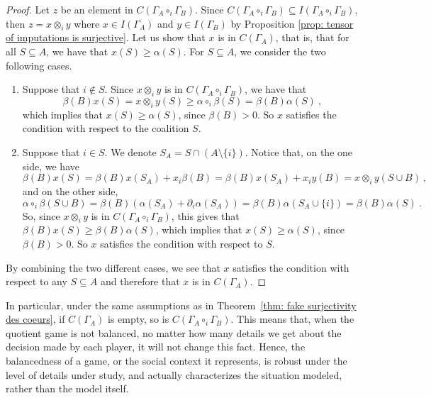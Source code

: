 \documentclass[a4paper,12pt]{amsart}
\begin{document}
\begin{proof}
Let $z$ be an element in $C(\Gamma_A \circ_i \Gamma_B)$. Since $C(\Gamma_A \circ_i \Gamma_B) \subseteq I(\Gamma_A \circ_i \Gamma_B)$, then $z = x \otimes_i y$ where $x \in I(\Gamma_A)$ and $y \in I(\Gamma_B)$ by Proposition \ref{prop: tensor of imputations is surjective}. Let us show that $x$ is in $C(\Gamma_A)$, that is, that for all $S \subseteq A$, we have that \(x(S) \geq \alpha(S)\). For $S \subseteq A$, we consider the two following cases.

\medskip

\begin{enumerate}
    \item Suppose that $i \notin S$. Since $x \otimes_i y$ is in $C(\Gamma_A \circ_i \Gamma_B)$, we have that
    \[
    \beta(B)x(S) = x \otimes_i y(S) \geq \alpha \circ_i \beta(S) = \beta(B)\alpha(S)~,  
    \]
    which implies that \(x(S) \geq \alpha(S)\), since $\beta(B) > 0$. So $x$ satisfies the condition with respect to the coalition $S$. 

\medskip

    \item Suppose that $i \in S$. We denote $S_A = S \cap (A \setminus \{i\})$. Notice that, on the one side, we have 
    \[
    \beta(B)x(S) = \beta(B)x(S_A) + x_i\beta(B) = \beta(B)x(S_A) + x_i y(B) = x \otimes_i y(S \cup B)~,
    \]
    and on the other side, 
    \[
    \alpha \circ_i \beta(S \cup B) = \beta(B) \left( \alpha(S_A) + \partial_i \alpha(S_A) \right) = \beta(B)\alpha(S_A \cup \{i\}) = \beta(B) \alpha(S)~. 
    \]
    So, since  $x \otimes_i y$ is in $C(\Gamma_A \circ_i \Gamma_B)$, this gives that \(\beta(B)x(S) \geq \beta(B)\alpha(S)\), which implies that \(x(S) \geq \alpha(S)\), since $\beta(B) > 0$. So $x$ satisfies the condition with respect to $S$. 
\end{enumerate}
By combining the two different cases, we see that $x$ satisfies the condition with respect to any $S \subseteq A$ and therefore that $x$ is in $C(\Gamma_A).$
\end{proof}

\begin{remark}
    In particular, under the same assumptions as in Theorem~\ref{thm: fake surjectivity des coeurs}, if $C(\Gamma_A)$ is empty, so is $C(\Gamma_A \circ_i \Gamma_B)$. This means that, when the quotient game is not balanced, no matter how many details we get about the decision made by each player, it will not change this fact. Hence, the balancedness of a game, or the social context it represents, is robust under the level of details under study, and actually characterizes the situation modeled, rather than the model itself. 
\end{remark}
\end{document}
